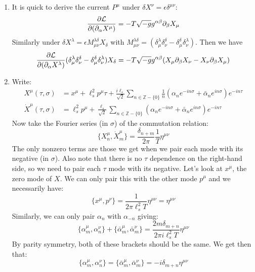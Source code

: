 \documentclass[11pt, class=article, crop=false]{standalone}
\begin{document}
\begin{enumerate}
		\item It is quick to derive the current $P^\mu$ under $\delta X^{\nu} = \epsilon \delta^{\mu \nu}$:
		\begin{equation}
			\frac{\partial \mathcal L}{\partial (\partial_\alpha X^\mu)} = -T \sqrt{-g} g^{\alpha \beta} \partial_\beta X_\mu
		\end{equation}
		Similarly under $\delta X^{\lambda} = \epsilon M_{\mu \nu}^{\lambda \delta} X_\delta$ with $M_{\mu \nu}^{\lambda \delta} = (\delta_\mu^\lambda \delta_\nu^{\delta} - \delta_\mu^{\delta} \delta_\nu^\lambda)$. Then we have 
		\begin{equation}
			\frac{\partial \mathcal L}{\partial (\partial_\alpha X^\lambda)} (\delta_\mu^\lambda \delta_\nu^{\delta} - \delta_\mu^{\delta} \delta_\nu^\lambda) X_\delta = -T \sqrt{-g} g^{\alpha \beta} (X_\mu \partial_\beta X_\nu - X_\nu \partial_\beta X_\mu)
		\end{equation}
		\item Write:
		\begin{equation}
			\begin{aligned}
				X^\mu(\tau, \sigma) &= x^\mu + \ell_s^2 p^\mu \tau + \frac{i \ell_s}{\sqrt 2} \sum_{n \in \mathbb Z - \{0\}} \frac{1}{n} (\alpha_n e^{-in\sigma} + \bar \alpha_{n} e^{i n \sigma}) e^{- i n \tau}\\
				\dot X^\mu(\tau, \sigma) &= \ell_s^2 p^\mu + \frac{\ell_s}{\sqrt 2} \sum_{n \in \mathbb Z - \{0\}} (\alpha_n e^{-in\sigma} + \bar \alpha_{n} e^{i n \sigma}) e^{- i n \tau}
			\end{aligned}
		\end{equation}
		Now take the Fourier series (in $\sigma$) of the commutation relation: 
		\begin{equation}
			\{X^\mu_{n}, \dot X^\mu_m\} = \frac{\delta_{n+m}}{2\pi} \frac{1}{T} \eta^{\mu \nu}
		\end{equation}
		The only nonzero terms are those we get when we pair each mode with its negative (in $\sigma$). Also note that there is no $\tau$ dependence on the right-hand side, so we need to pair each $\tau$ mode with its negative. Let's look at $x^\mu$, the zero mode of $X$. We can only pair this with the other mode $p^\mu$ and we necessarily have:
		\begin{equation}
			\{x^\mu, p^\nu\} = \frac{1}{2 \pi \ell_s^2 T}  \eta^{\mu \nu} = \eta^{\mu \nu}
		\end{equation}
		Similarly, we can only pair $\alpha_n$ with $\alpha_{-n}$ giving:
		\begin{equation}
			\{\alpha_m^\mu, \alpha_n^\nu\} + \{\bar \alpha_{m}^\mu, \bar \alpha_m^\nu\} = \frac{2 m \delta_{m+n}}{2 \pi i \ell_s^2 T} \eta^{\mu \nu}
		\end{equation}
		By parity symmetry, both of these brackets should be the same. We get then that:
		\begin{equation}
			\{\alpha_m^\mu, \alpha_n^\nu\}= \{\bar \alpha_{m}^\mu, \bar \alpha_m^\nu\}= -i \delta_{m+n} \eta^{\mu \nu}
		\end{equation}
		

\end{enumerate}
\end{document}
